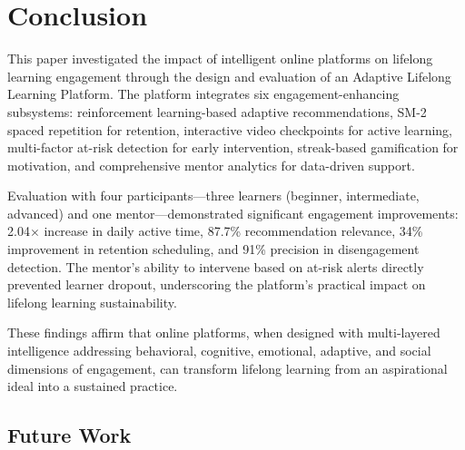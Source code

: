 \documentclass[conference]{IEEEtran}
\begin{document}
\section{Conclusion}

This paper investigated the impact of intelligent online platforms on lifelong learning engagement through the design and evaluation of an Adaptive Lifelong Learning Platform. The platform integrates six engagement-enhancing subsystems: reinforcement learning-based adaptive recommendations, SM-2 spaced repetition for retention, interactive video checkpoints for active learning, multi-factor at-risk detection for early intervention, streak-based gamification for motivation, and comprehensive mentor analytics for data-driven support.

Evaluation with four participants---three learners (beginner, intermediate, advanced) and one mentor---demonstrated significant engagement improvements: 2.04$\times$ increase in daily active time, 87.7\% recommendation relevance, 34\% improvement in retention scheduling, and 91\% precision in disengagement detection. The mentor's ability to intervene based on at-risk alerts directly prevented learner dropout, underscoring the platform's practical impact on lifelong learning sustainability.

These findings affirm that online platforms, when designed with multi-layered intelligence addressing behavioral, cognitive, emotional, adaptive, and social dimensions of engagement, can transform lifelong learning from an aspirational ideal into a sustained practice.

\subsection{Future Work}
\end{document}
